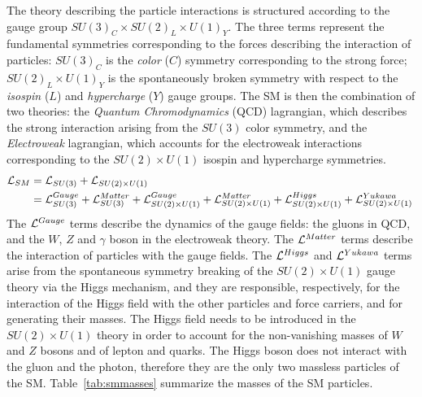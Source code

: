 The theory describing the particle interactions is structured
according to the gauge group $SU(3)_C\times{}SU(2)_L\times{}U(1)_Y$. The three
terms represent the fundamental symmetries corresponding to the forces describing the
interaction of particles: $SU(3)_C$ is the {\it color} ($C$) symmetry corresponding
to the strong force; $SU(2)_L\times{}U(1)_Y$ is the spontaneously
broken symmetry with respect to the {\it isospin} ($L$)
and {\it hypercharge} ($Y$) gauge groups.
The SM is then the combination of two theories: the {\it Quantum
  Chromodynamics} (QCD) lagrangian, which describes the strong
interaction arising from the $SU(3)$ color symmetry, and the {\it
  Electroweak} lagrangian, which accounts for the electroweak
interactions corresponding to the $SU(2)\times{}U(1)$ isospin and
hypercharge symmetries.
\begin{equation}
\begin{split}
\mathcal{L}{}_{SM}  & = \mathcal{L}{}_{SU(3)} + \mathcal{L}{}_{SU(2)\times{}U(1)} \\
& = \mathcal{L}{}_{SU(3)}^{Gauge} + \mathcal{L}{}_{SU(3)}^{Matter} 
+ \mathcal{L}{}_{SU(2)\times{}U(1)}^{Gauge} + \mathcal{L}{}_{SU(2)\times{}U(1)}^{Matter}
+ \mathcal{L}{}_{SU(2)\times{}U(1)}^{Higgs} +
\mathcal{L}{}_{SU(2)\times{}U(1)}^{Yukawa} \\
\end{split}
\phantom{.}
\end{equation}
The $\mathcal{L}{}^{Gauge}$ terms describe the dynamics of the gauge fields:
the gluons in QCD, and the $W$, $Z$ and $\gamma$ boson in the
electroweak theory.
The $\mathcal{L}{}^{Matter}$ terms describe the
interaction of particles with the gauge fields. The $\mathcal{L}{}^{Higgs}$
and $\mathcal{L}{}^{Yukawa}$ terms arise from the spontaneous symmetry
breaking of the $SU(2)\times{}U(1)$ gauge theory via the Higgs
mechanism, and they are responsible, respectively, for the interaction
of the Higgs field with the other particles and force carriers, and
for generating their masses.
The Higgs field
needs to be introduced in
the $SU(2)\times{}U(1)$ theory in order to account for the
non-vanishing masses of $W$ and $Z$ bosons and of lepton and quarks.
The Higgs boson does not interact with the gluon and the photon,
therefore they are the only two massless particles of the
SM. Table~\ref{tab:smmasses} summarize the masses of the SM particles.

